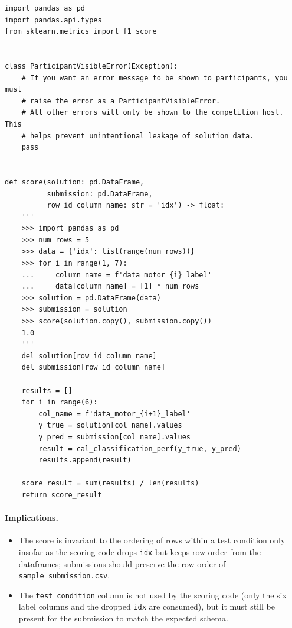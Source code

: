 \documentclass[11pt,a4paper]{article}
\begin{document}
\begin{lstlisting}[style=py]
import pandas as pd
import pandas.api.types
from sklearn.metrics import f1_score


class ParticipantVisibleError(Exception):
    # If you want an error message to be shown to participants, you must
    # raise the error as a ParticipantVisibleError.
    # All other errors will only be shown to the competition host. This
    # helps prevent unintentional leakage of solution data.
    pass


def score(solution: pd.DataFrame,
          submission: pd.DataFrame,
          row_id_column_name: str = 'idx') -> float:
    '''
    >>> import pandas as pd
    >>> num_rows = 5
    >>> data = {'idx': list(range(num_rows))}
    >>> for i in range(1, 7):
    ...     column_name = f'data_motor_{i}_label'
    ...     data[column_name] = [1] * num_rows
    >>> solution = pd.DataFrame(data)
    >>> submission = solution
    >>> score(solution.copy(), submission.copy())
    1.0
    '''
    del solution[row_id_column_name]
    del submission[row_id_column_name]

    results = []
    for i in range(6):
        col_name = f'data_motor_{i+1}_label'
        y_true = solution[col_name].values
        y_pred = submission[col_name].values
        result = cal_classification_perf(y_true, y_pred)
        results.append(result)

    score_result = sum(results) / len(results)
    return score_result
\end{lstlisting}

\paragraph{Implications.}
\begin{itemize}[leftmargin=1.4em]
  \item The score is invariant to the ordering of rows within a test condition
        only insofar as the scoring code drops \texttt{idx} but keeps row
        order from the dataframes; submissions should preserve the row order
        of \texttt{sample\_submission.csv}.
  \item The \texttt{test\_condition} column is not used by the scoring code
        (only the six label columns and the dropped \texttt{idx} are
        consumed), but it must still be present for the submission to match
        the expected schema.
\end{itemize}

\end{document}
